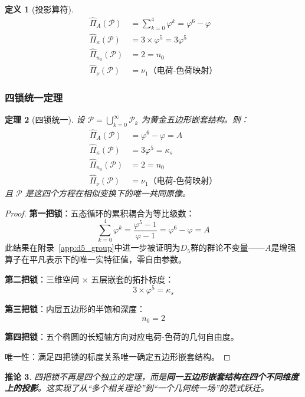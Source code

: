 \documentclass[12pt,a4paper,twocolumn]{article}
\renewcommand{\phi}{\varphi}
\newtheorem{theorem}{定理}[section]
\newtheorem{corollary}[theorem]{推论}
\newtheorem{definition}[theorem]{定义}
\begin{document}
\begin{definition}[投影算符]
\begin{align}
\hat{\Pi}_A(\mathcal{P}) &= \sum_{k=0}^{4} \phi^k = \phi^6 - \phi \\
\hat{\Pi}_\kappa(\mathcal{P}) &= 3 \times \phi^5 = 3\phi^5 \\
\hat{\Pi}_{n_0}(\mathcal{P}) &= 2 = n_0 \\
\hat{\Pi}_\nu(\mathcal{P}) &= \nu_1 \text{（电荷-色荷映射）}
\end{align}
\end{definition}

\subsubsection{四锁统一定理}

\begin{theorem}[四锁统一]
设 $\mathcal{P} = \bigcup_{k=0}^\infty \mathcal{P}_k$ 为黄金五边形嵌套结构。则：
\begin{align}
\hat{\Pi}_A(\mathcal{P}) &= \phi^6 - \phi = A \\
\hat{\Pi}_\kappa(\mathcal{P}) &= 3\phi^5 = \kappa_s \\
\hat{\Pi}_{n_0}(\mathcal{P}) &= 2 = n_0 \\
\hat{\Pi}_\nu(\mathcal{P}) &= \nu_1 \text{（电荷-色荷映射）}
\end{align}
且 $\mathcal{P}$ 是这四个方程在相似变换下的唯一共同原像。
\end{theorem}

\begin{proof}
\textbf{第一把锁}：五态循环的累积耦合为等比级数：
$$\sum_{k=0}^{4}\phi^k = \frac{\phi^5-1}{\phi-1} = \phi^6 - \phi = A$$
此结果在附录~\ref{app:d5_group}中进一步被证明为$D_5$群的群论不变量——$A$是增强算子在平凡表示下的唯一实特征值，零自由参数。

\textbf{第二把锁}：三维空间 $\times$ 五层嵌套的拓扑标度：
$$3 \times \phi^5 = \kappa_s$$

\textbf{第三把锁}：内层五边形的半饱和深度：
$$n_0 = 2$$

\textbf{第四把锁}：五个椭圆的长短轴方向对应电荷-色荷的几何自由度。

唯一性：满足四把锁的标度关系唯一确定五边形嵌套结构。
\end{proof}

\begin{corollary}
四把锁不再是四个独立的定理，而是\textbf{同一五边形嵌套结构在四个不同维度上的投影}。这实现了从``多个相关理论''到``一个几何统一场''的范式跃迁。
\end{corollary}
\end{document}
